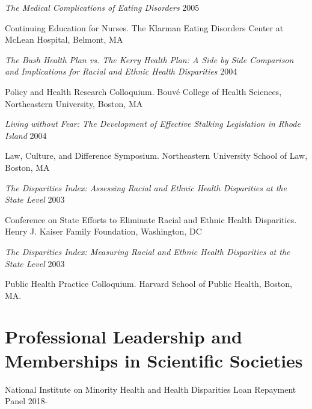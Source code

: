 \documentclass[10pt,]{article}
\begin{document}
{{{{{{{{{{{{{{{\begin{hangparas}{.5in}{1}
{\textit {The Medical Complications of Eating Disorders}} \hfill 2005 
\vspace{-2.5mm}
\begin{adjustwidth}{0.5cm}{1cm}
Continuing Education for Nurses. The Klarman Eating Disorders Center at McLean Hospital, Belmont, MA
\end{adjustwidth}

{\textit {The Bush Health Plan vs. The Kerry Health Plan: A Side by Side Comparison and Implications for Racial and Ethnic Health Disparities}} \hfill 2004 
\vspace{-2.5mm}
\begin{adjustwidth}{0.5cm}{1cm}
Policy and Health Research Colloquium. Bouvé College of Health Sciences, Northeastern University, Boston, MA
\end{adjustwidth}

{\textit {Living without Fear: The Development of Effective Stalking Legislation in Rhode Island}} \hfill 2004 
\vspace{-2.5mm}
\begin{adjustwidth}{0.5cm}{1cm}
Law, Culture, and Difference Symposium. Northeastern University School of Law, Boston, MA
\end{adjustwidth}

{\textit {The Disparities Index: Assessing Racial and Ethnic Health Disparities at the State Level}} \hfill 2003 
\vspace{-2.5mm}
\begin{adjustwidth}{0.5cm}{1cm}
Conference on State Efforts to Eliminate Racial and Ethnic Health Disparities. Henry J. Kaiser Family Foundation, Washington, DC
\end{adjustwidth}

{\textit {The Disparities Index: Measuring Racial and Ethnic Health Disparities at the State Level}} \hfill 2003 
\vspace{-2.5mm}
\begin{adjustwidth}{0.5cm}{1cm}
Public Health Practice Colloquium. Harvard School of Public Health, Boston, MA.
\end{adjustwidth}

\end{hangparas}

\section{\Large \sc Professional Leadership and Memberships in Scientific Societies}

National Institute on Minority Health and Health Disparities Loan Repayment Panel \hfill {2018-{\small{}}} 

}}}}}}}}}}}}}}}
\end{document}
